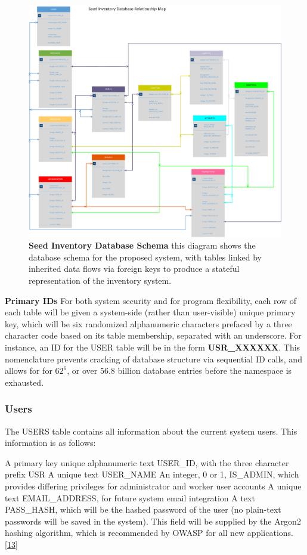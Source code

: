 \documentclass[12pt, letterpaper,oneocolumn]{article}
\begin{document}
	\begin{center}
	\begin{figure}[H]
	\includegraphics[width=\linewidth]{SeedInventoryDB.png}
	\caption{\textbf{Seed Inventory Database Schema} this diagram shows the database schema for the proposed system, with tables linked by inherited data flows via foreign keys to produce a stateful representation of the inventory system.}
		\end{figure}
\end{center}
	\textbf{Primary IDs} For both system security and for program flexibility, each row of each table will be given a system-side (rather than user-visible) unique primary key, which will be six randomized alphanumeric characters prefaced by a three character code based on its table membership, separated with an underscore. For instance, an ID for the USER table will be in the form \textbf{USR\_XXXXXX}. This nomenclature prevents cracking of database structure via sequential ID calls, and allows for for $62^6$, or over 56.8 billion database entries before the namespace is exhausted.
		\subsubsection{Users}
The USERS table contains all information about the current system users. This information is as follows: \\
\begin{outline}
	\1 A primary key unique alphanumeric text USER\_ID, with the three character prefix USR
	\1 A unique text USER\_NAME
	\1 An integer, 0 or 1, IS\_ADMIN, which provides differing privileges for administrator and worker user accounts
	\1 A unique text EMAIL\_ADDRESS, for future system email integration
	\1 A text PASS\_HASH, which will be the hashed password of the user (no plain-text passwords will be saved in the system). This field will be supplied by the Argon2 hashing algorithm, which is recommended by OWASP for all new applications. \href{https://cheatsheetseries.owasp.org/cheatsheets/Password_Storage_Cheat_Sheet.html}{[13]}
\end{outline}
\end{document}

